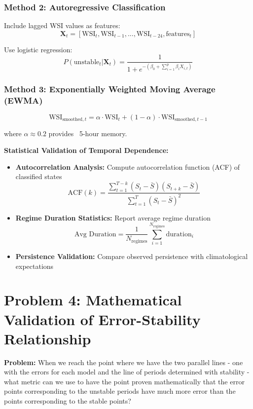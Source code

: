 \documentclass[11pt,a4paper]{article}
\begin{document}
\subsubsection{Method 2: Autoregressive Classification}
Include lagged WSI values as features:
$$\mathbf{X}_t = [\text{WSI}_t, \text{WSI}_{t-1}, ..., \text{WSI}_{t-24}, \text{features}_t]$$

Use logistic regression:
$$P(\text{unstable}_t | \mathbf{X}_t) = \frac{1}{1 + e^{-(\beta_0 + \sum_{i=1}^{p} \beta_i X_{i,t})}}$$

\subsubsection{Method 3: Exponentially Weighted Moving Average (EWMA)}
\begin{equation}
\text{WSI}_{\text{smoothed},t} = \alpha \cdot \text{WSI}_t + (1-\alpha) \cdot \text{WSI}_{\text{smoothed},t-1}
\end{equation}

where $\alpha \approx 0.2$ provides ~5-hour memory.

\begin{validationbox}
\textbf{Statistical Validation of Temporal Dependence:}

\begin{itemize}
    \item \textbf{Autocorrelation Analysis:} Compute autocorrelation function (ACF) of classified states
    $$\text{ACF}(k) = \frac{\sum_{t=1}^{T-k} (S_t - \bar{S})(S_{t+k} - \bar{S})}{\sum_{t=1}^{T} (S_t - \bar{S})^2}$$
    \item \textbf{Regime Duration Statistics:} Report average regime duration
    $$\text{Avg Duration} = \frac{1}{N_{\text{regimes}}} \sum_{i=1}^{N_{\text{regimes}}} \text{duration}_i$$
    \item \textbf{Persistence Validation:} Compare observed persistence with climatological expectations
\end{itemize}
\end{validationbox}

\section{Problem 4: Mathematical Validation of Error-Stability Relationship}

\begin{problembox}
\textbf{Problem:} When we reach the point where we have the two parallel lines - one with the errors for each model and the line of periods determined with stability - what metric can we use to have the point proven mathematically that the error points corresponding to the unstable periods have much more error than the points corresponding to the stable points?
\end{problembox}
\end{document}
